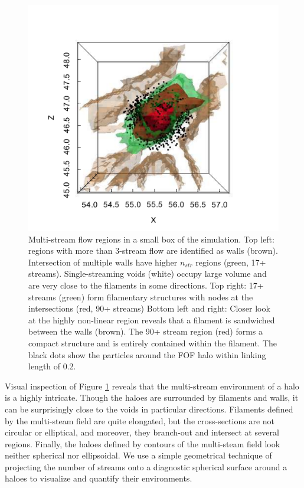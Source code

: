 \begin{figure}
\begin{minipage}[c]{0.45\linewidth}
\end{minipage}
\begin{minipage}[c]{0.45\linewidth}
\includegraphics[width=9.cm]{Chapter3/Source_v2/fig5d} 
\end{minipage} 

\caption{Multi-stream flow regions in a small box of the simulation. Top left: regions with more than 3-stream flow are identified as walls (brown). Intersection of multiple walls have higher $n_{str}$ regions (green, 17+ streams). Single-streaming voids (white) occupy large volume and are very close to the filaments in some directions. Top right: 17+ streams (green) form filamentary structures with nodes at the intersections (red, 90+ streams)
Bottom left and right:  Closer look at the highly non-linear region reveals that a filament is sandwiched between the walls (brown). The 90+ stream region (red) forms a compact structure and is entirely contained within the filament. The black dots show the particles around the FOF halo within linking length of 0.2.}
\label{fig:4view}
\end{figure}

Visual inspection of Figure \ref{fig:4view} reveals that the multi-stream environment of a halo is a highly intricate. Though the haloes are surrounded by filaments and walls, it can be surprisingly close to the voids in particular directions. Filaments 
defined by the multi-steam field are  quite elongated, but the cross-sections are not circular or elliptical, and moreover, they branch-out and intersect at several regions. Finally, the  haloes defined by contours of the multi-steam field look neither spherical nor ellipsoidal. 
We use a simple geometrical technique of projecting the number of streams onto a diagnostic spherical surface around 
a haloes to visualize and quantify their environments.  


